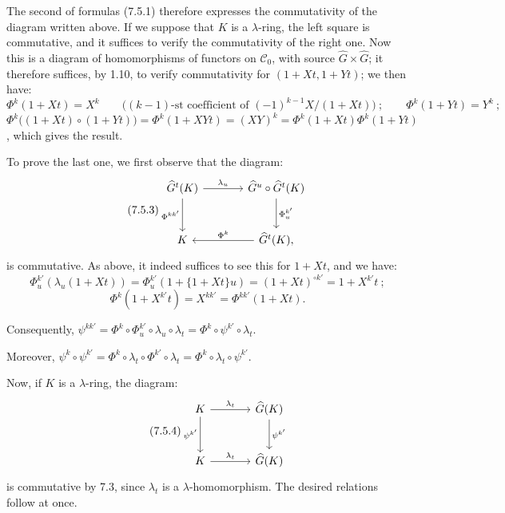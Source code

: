 The second of formulas (7.5.1) therefore expresses the commutativity of the diagram written above. If we suppose that \(K\) is a \(\lambda\)-ring, the left square is commutative, and it suffices to verify the commutativity of the right one. Now this is a diagram of homomorphisms of functors on \(\mathcal C_0\), with source \(\widehat G\times\widehat G\); it therefore suffices, by 1.10, to verify commutativity for \((1+Xt,1+Yt)\); we then have:
\[
  \Phi^k(1+Xt)=X^k\qquad\bigl(\text{$(k-1)$-st coefficient of }(-1)^{k-1}X/(1+Xt)\bigr)~;\qquad
  \Phi^k(1+Yt)=Y^k~;
\]
\(\Phi^k\bigl((1+Xt)\circ(1+Yt)\bigr)=\Phi^k(1+XYt)=(XY)^k=\Phi^k(1+Xt)\Phi^k(1+Yt)\), which gives the result.

To prove the last one, we first observe that the diagram:
\begin{equation}\tag{7.5.3}
\begin{tikzcd}[column sep=large,row sep=large]
\widehat G^t(K) \arrow[r,"\lambda_u"] \arrow[d,"\Phi^{kk'}"'] &
\widehat G^u\circ\widehat G^t(K) \arrow[d,"\Phi^{k'}_u"]\\
K &
\widehat G^t(K), \arrow[l,"\Phi^k"']
\end{tikzcd}
\end{equation}
is commutative. As above, it indeed suffices to see this for \(1+Xt\), and we have:
\[
  \Phi^{k'}_u(\lambda_u(1+Xt))
  =
  \Phi^{k'}_u(1+\{1+Xt\}u)
  =
  (1+Xt)^{\circ k'}
  =
  1+X^{k'}t~;
\]
\[
  \Phi^k(1+X^{k'}t)=X^{kk'}=\Phi^{kk'}(1+Xt).
\]

Consequently, \(\psi^{kk'}=\Phi^k\circ\Phi^{k'}_u\circ\lambda_u\circ\lambda_t=\Phi^k\circ\psi^{k'}\circ\lambda_t\).

Moreover, \(\psi^k\circ\psi^{k'}=\Phi^k\circ\lambda_t\circ\Phi^{k'}\circ\lambda_t=\Phi^k\circ\lambda_t\circ\psi^{k'}\).

%
Now, if \(K\) is a \(\lambda\)-ring, the diagram:
\begin{equation}\tag{7.5.4}
\begin{tikzcd}[column sep=large,row sep=large]
K \arrow[r,"\lambda_t"] \arrow[d,"\psi^{k'}"'] &
\widehat G(K) \arrow[d,"\psi^{k'}"]\\
K \arrow[r,"\lambda_t"] &
\widehat G(K)
\end{tikzcd}
\end{equation}
is commutative by 7.3, since \(\lambda_t\) is a \(\lambda\)-homomorphism. The desired relations follow at once.

